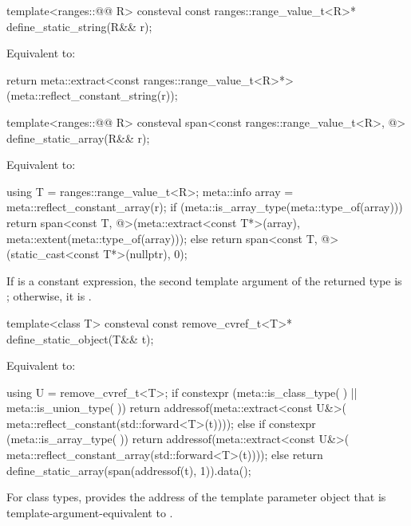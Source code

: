 %
\begin{itemdecl}
template<ranges::@@ R>
  consteval const ranges::range_value_t<R>* define_static_string(R&& r);
\end{itemdecl}

\begin{itemdescr}
\pnum
\effects
Equivalent to:
\begin{codeblock}
return meta::extract<const ranges::range_value_t<R>*>(meta::reflect_constant_string(r));
\end{codeblock}
\end{itemdescr}

%
\begin{itemdecl}
template<ranges::@@ R>
  consteval span<const ranges::range_value_t<R>, @\seebelow@> define_static_array(R&& r);
\end{itemdecl}

\begin{itemdescr}
\pnum
\effects
Equivalent to:
\begin{codeblock}
using T = ranges::range_value_t<R>;
meta::info array = meta::reflect_constant_array(r);
if (meta::is_array_type(meta::type_of(array))) {
  return span<const T, @\seebelownc@>(meta::extract<const T*>(array),
                                  meta::extent(meta::type_of(array)));
} else {
  return span<const T, @\seebelow@>(static_cast<const T*>(nullptr), 0);
}
\end{codeblock}

\pnum
\remarks
If  is a constant expression,
the second template argument of the returned  type
is ;
otherwise, it is .
\end{itemdescr}

%
\begin{itemdecl}
template<class T>
  consteval const remove_cvref_t<T>* define_static_object(T&& t);
\end{itemdecl}

\begin{itemdescr}
\pnum
\effects
Equivalent to:
\begin{codeblock}
using U = remove_cvref_t<T>;
if constexpr (meta::is_class_type(^^U) || meta::is_union_type(^^U)) {
  return addressof(meta::extract<const U&>(
                     meta::reflect_constant(std::forward<T>(t))));
} else if constexpr (meta::is_array_type(^^U)) {
  return addressof(meta::extract<const U&>(
                     meta::reflect_constant_array(std::forward<T>(t))));
} else {
  return define_static_array(span(addressof(t), 1)).data();
}
\end{codeblock}

\pnum
\begin{note}
For class types,
 provides
the address of the template parameter object
that is template-argument-equivalent to .
\end{note}
\end{itemdescr}

